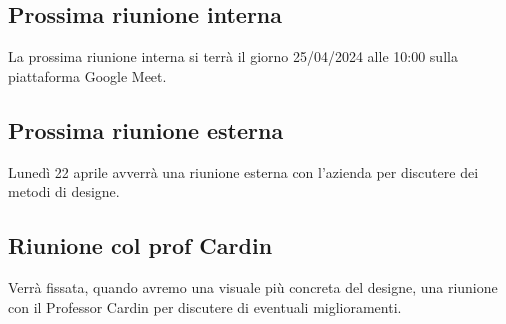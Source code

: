 \documentclass{article}
\begin{document}
\subsection{Prossima riunione interna}
La prossima riunione interna si terrà il giorno 25/04/2024 alle 10:00 sulla piattaforma Google Meet.
\subsection{Prossima riunione esterna}
Lunedì 22 aprile avverrà una riunione esterna con l'azienda per discutere dei metodi di designe.
\subsection{Riunione col prof Cardin}
Verrà fissata, quando avremo una visuale più concreta del designe, una riunione con il Professor Cardin per discutere di eventuali miglioramenti.
\end{document}

